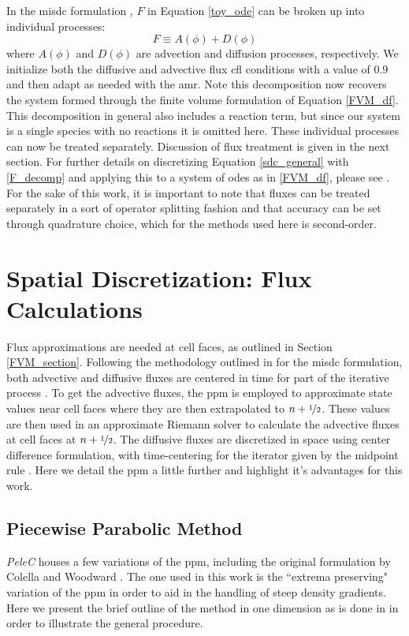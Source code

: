 In the \gls{misdc} formulation \cite{MISDC_general}, $F$ in Equation \eqref{toy_ode} can be broken up into individual processes: 
\begin{equation} \label{F_decomp}
F \equiv A(\phi) + D(\phi)
\end{equation}
where $A(\phi)$ and $D(\phi)$ are advection and diffusion processes, respectively. We initialize both the diffusive and advective flux \gls{cfl} conditions with a value of $0.9$ and then adapt as needed with the \gls{amr}. Note this decomposition now recovers the system formed through the finite volume formulation of Equation \eqref{FVM_df}. This decomposition in general also includes a reaction term, but since our system is a single species with no reactions it is omitted here. These individual processes can now be treated separately. Discussion of flux treatment is given in the next section. For further details on discretizing Equation \eqref{sdc_general} with \eqref{F_decomp} and applying this to a system of \gls{ode}s as in \eqref{FVM_df}, please see \cite{SDC_PeleC}. For the sake of this work, it is important to note that fluxes can be treated separately in a sort of operator splitting fashion and that accuracy can be set through quadrature choice, which for the methods used here is second-order. 


\section{Spatial Discretization: Flux Calculations}
Flux approximations are needed at cell faces, as outlined in Section \ref{FVM_section}. Following the methodology outlined in for the \gls{misdc} formulation, both advective and diffusive fluxes are centered in time for part of the iterative process \cite{MISDC_general}. To get the advective fluxes, the \gls{ppm} \cite{1984JCoPPPM} is employed to approximate state values near cell faces where they are then extrapolated to $n+\nicefrac{1}{2}$. These values are then used in an approximate Riemann solver \cite{COLELLA1985264} to calculate the advective fluxes at cell faces at $n+\nicefrac{1}{2}$. The diffusive fluxes are discretized in space using center difference formulation, with time-centering for the iterator given by the midpoint rule \cite{COLELLA20087069, MILLER200226}. Here we detail the \gls{ppm} a little further and highlight it's advantages for this work.
\subsection{Piecewise Parabolic Method}
\textit{PeleC} houses a few variations of the \gls{ppm}, including the original formulation by Colella and Woodward \cite{1984JCoPPPM}. The one used in this work is the ``extrema preserving" variation of the \gls{ppm} \cite{COLELLA20087069, MILLER200226} in order to aid in the handling of steep density gradients. Here we present the brief outline of the method in one dimension as is done in \cite{PPM_WENO} in order to illustrate the general procedure. 

